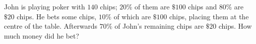 John is playing poker with $140$ chips; $20\%$ of them are $\$100$ chips and $80\%$ are $\$20$ chips. He bets some chips, $10\%$ of which are $\$100$ chips, placing them at the centre of the table. Afterwards $70\%$ of John's remaining chips are $\$20$ chips. How much money did he bet?
